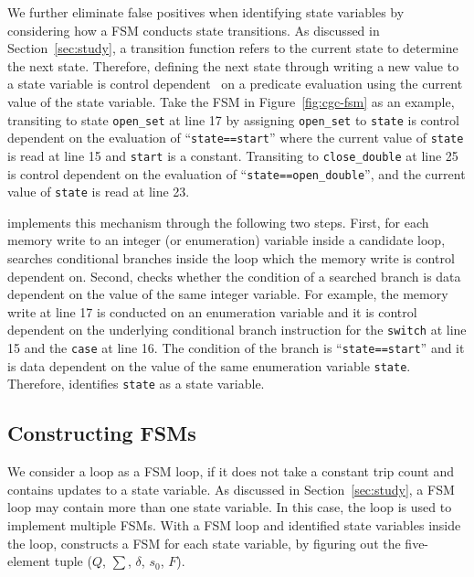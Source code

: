 We further eliminate false positives when identifying state variables 
by considering how a FSM conducts state transitions. 
As discussed in Section~\ref{sec:study}, 
a transition function refers to the current state to determine the next state. 
Therefore, defining the next state through writing a new value to a state variable 
is control dependent~\cite{cdg} on a predicate evaluation 
using the current value of the state variable.  
Take the FSM in Figure~\ref{fig:cgc-fsm} as an example, 
transiting to state \texttt{open\_set} at line 17 by assigning \texttt{open\_set}
to \texttt{state} 
is control dependent on the evaluation of ``\texttt{state==start}''
where the current value of \texttt{state} is read at 
line 15 and \texttt{start} is a constant. 
Transiting to \texttt{close\_double} at 
line 25 is control dependent on the 
evaluation of ``\texttt{state==open\_double}'', 
and the current value of \texttt{state} is read at line 23.


\Tool{} implements this mechanism through the following two steps. 
First, for each memory write to an integer (or enumeration) 
variable inside a candidate loop, 
\Tool{} searches conditional branches inside the loop 
which the memory write is control dependent on. 
Second, \Tool{} checks whether the condition of a searched branch 
is data dependent on the value of the same integer variable. 
For example, the memory write at line 17 is conducted on an enumeration variable
and it is control dependent on the underlying conditional branch 
instruction for 
the \texttt{switch} at line 15 and the \texttt{case} at line 16.  
The condition of the branch is ``\texttt{state==start}'' and it is 
data dependent on the value of the same enumeration variable \texttt{state}. 
Therefore, \Tool{} identifies \texttt{state} as a state variable. 


\subsection{Constructing FSMs}
\label{sec:tuple}
We consider a loop as a FSM loop, if it does not take a constant trip count 
and contains updates to a state variable.
As discussed in Section~\ref{sec:study}, 
a FSM loop may contain more than one state variable. 
In this case, the loop is used to implement multiple FSMs.
With a FSM loop and identified state variables inside the loop, 
\Tool{} constructs a FSM for each state variable, 
by figuring out the five-element 
tuple ($Q$, $\sum$, $\delta$, $s_0$, $F$). 

